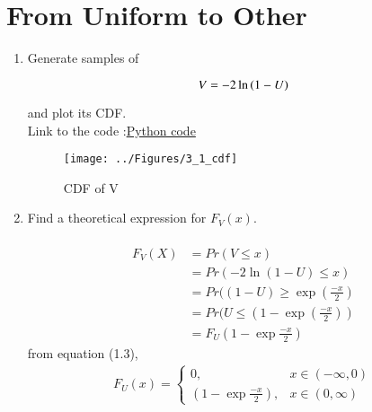 \documentclass[journal,12pt,twocolumn]{IEEEtran}
\renewcommand\thesection{\arabic{section}}
\begin{document}
\section{From Uniform to Other}
\begin{enumerate}[label=\thesection.\arabic*
,ref=\thesection.\theenumi]

\item
Generate samples of 

\begin{equation}
V = -2\ln\left(1-U\right)
\end{equation}

and plot its CDF. \\
\solution Link to the code :\href{https://github.com/anikettsatpute/Probability-and-Random-Variable-Assignment/blob/main/code/code3_2.c}{Python code}
\begin{figure}[h]
\centering
\texttt{[image: ../Figures/3\_1\_cdf]}
\caption{CDF of V}
\label{fig:gauss_pdf}
\end{figure}

\item Find a theoretical expression for $F_V(x)$.\\
\solution \\
\begin{align*}
F_V(X) &= Pr(V \le x)\\
&= Pr(-2 \ln(1-U) \le x)\\
&= Pr((1-U) \ge \exp(\frac{-x}{2})\\
&= Pr(U \le (1-\exp(\frac{-x}{2}))\\
&= F_U(1-\exp \frac{-x}{2})
\end{align*} 
from equation (1.3),
\begin{align*}
F_U(x) = 
\begin{cases}
0, & x \in (-\infty,0) \\
(1-\exp \frac{-x}{2}), & x \in (0,\infty)
\end{cases}
\end{align*}
\end{enumerate}
\end{document}
